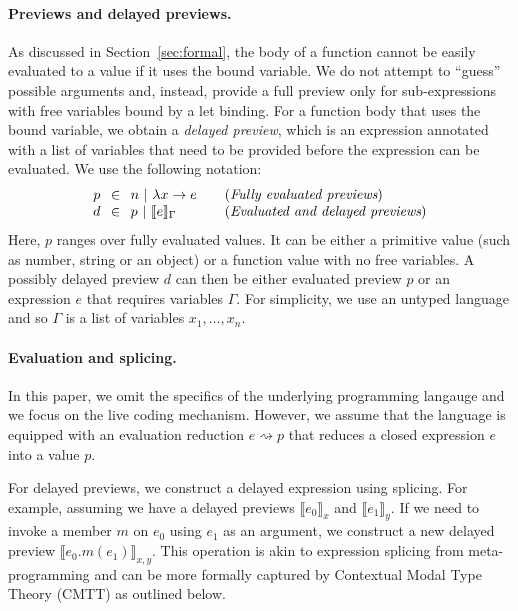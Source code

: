 \documentclass[sigplan,10pt,review,anonymous]{acmart}\settopmatter{printfolios=true,printccs=false,printacmref=false}
\theoremstyle{plain}
\theoremstyle{definition}
\begin{document}
\paragraph{Previews and delayed previews.}
As discussed in Section~\ref{sec:formal}, the body of a function cannot be easily evaluated to
a value if it uses the bound variable. We do not attempt to ``guess'' possible arguments and,
instead, provide a full preview only for sub-expressions with free variables bound by a let binding.
For a function body that uses the bound variable, we obtain a \emph{delayed preview}, which is
an expression annotated with a list of variables that need to be provided before the expression
can be evaluated. We use the following notation:
%
\begin{equation*}
\begin{array}{rcll}
p&\hspace{-0.25em}\in\hspace{-0.25em}&n~|~\lambda x\rightarrow e&\quad(\textit{Fully evaluated previews})\\
d&\hspace{-0.25em}\in\hspace{-0.25em}&p~|~\llbracket e \rrbracket_\Gamma&\quad(\textit{Evaluated and delayed previews})\\
\end{array}
\end{equation*}
%
Here, $p$ ranges over fully evaluated values. It can be either a primitive value (such as number,
string or an object) or a function value with no free variables. A possibly delayed preview $d$ 
can then be either evaluated preview $p$ or an expression $e$ that requires variables $\Gamma$.
For simplicity, we use an untyped language and so $\Gamma$ is a list of variables $x_1, \ldots, x_n$.

\paragraph{Evaluation and splicing.}
In this paper, we omit the specifics of the underlying programming langauge and we focus on the
live coding mechanism. However, we assume that the language is equipped with an evaluation 
reduction $e \rightsquigarrow p$ that reduces a closed expression $e$ into a value $p$.

For delayed previews, we construct a delayed expression using splicing. For example, assuming
we have a delayed previews $\llbracket e_0 \rrbracket_x$ and $\llbracket e_1 \rrbracket_y$. 
If we need to invoke a member $m$ on $e_0$ using $e_1$ as an argument, we construct a new 
delayed preview $\llbracket e_0.m(e_1) \rrbracket_{x, y}$. This operation is akin to expression
splicing from meta-programming \cite{metaml,quotations} and can be more formally captured by 
Contextual Modal Type Theory (CMTT) as outlined below.
\end{document}
